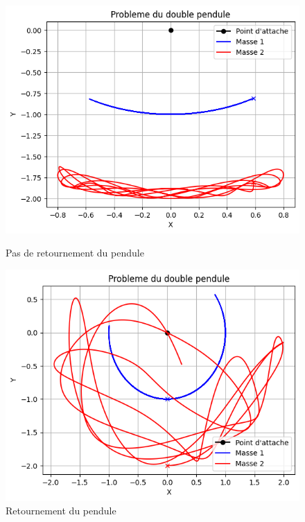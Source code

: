\begin{figure} [htbp!]
	\begin{minipage}[c]{0.45\textwidth}
		\centering
		\includegraphics[width=\textwidth]{res/no_retournement.png}
		\caption{Pas de retournement du pendule}
		\label{fig:no_retournement}
	\end{minipage}\hfill
	\begin{minipage}[c]{0.45\textwidth}
		\centering
		\includegraphics[width=\textwidth]{res/retournement.png}
		\caption{Retournement du pendule}
		\label{fig:retournement}
	\end{minipage}
\end{figure}
